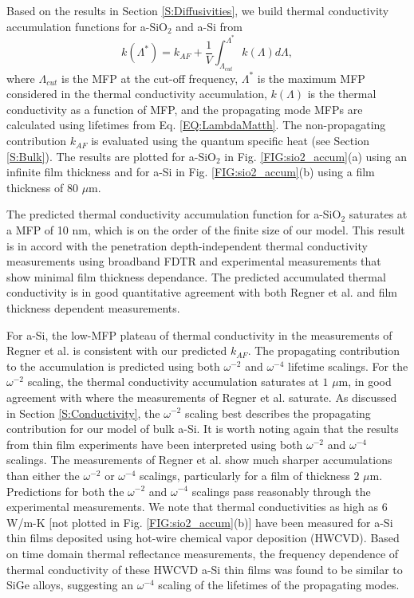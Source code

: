 \documentclass[aps,prb,onecolumn,preprint,superscriptaddress,footinbib,amsmath,amssymb,floatfix]{revtex4}
\begin{document}
Based on the results in Section \ref{S:Diffusivities}, we build 
thermal conductivity accumulation functions for a-SiO$_2$ and a-Si from
\begin{equation}\label{EQ:kLambda}
k(\Lambda^{*}) = k_{AF} + 
\frac{1}{V}\int^{\Lambda^{*}}_{\Lambda_{cut}} 
k(\Lambda)d\Lambda,
\end{equation}
where $\Lambda_{cut}$ is the MFP at the cut-off frequency, 
$\Lambda^*$ is the maximum MFP considered in the thermal 
conductivity accumulation, $k(\Lambda)$ is the thermal conductivity 
as a function of MFP, and the propagating mode MFPs are 
calculated using lifetimes from Eq. \eqref{EQ:LambdaMatth}. The 
non-propagating contribution $k_{AF}$ is evaluated using the quantum 
specific heat (see Section \ref{S:Bulk}). 
The results are plotted for a-SiO$_2$ 
in Fig. \ref{FIG:sio2_accum}(a) using an infinite film thickness 
and for a-Si in Fig. \ref{FIG:sio2_accum}(b) using a film 
thickness of $80$ $\mu$m.  

The predicted thermal conductivity accumulation function for a-SiO$_2$ 
saturates at a MFP of 10 nm, which is on the order of the finite size 
of our model. This result is in accord 
with the penetration depth-independent thermal 
conductivity measurements using broadband FDTR
\cite{regner_broadband_2013} and experimental measurements 
that show minimal film thickness dependance.
\cite{lee_heat_1997,yamane_measurement_2002} The predicted 
accumulated thermal conductivity is in good quantitative 
agreement with both Regner et al. and film thickness dependent 
measurements. 

For a-Si, the low-MFP plateau of thermal conductivity in the   
measurements of Regner et al. is consistent with our 
predicted $k_{AF}$. 
The propagating contribution to the accumulation is predicted 
using both $\omega^{-2}$ and $\omega^{-4}$ lifetime scalings.  
For the $\omega^{-2}$ scaling, the thermal conductivity accumulation 
saturates at $1$ $\mu$m, in good agreement with where the measurements 
of Regner et al. saturate. 
As discussed in Section \ref{S:Conductivity}, 
the $\omega^{-2}$ scaling best describes the propagating 
contribution for our model of bulk a-Si. 
It is worth noting again 
that the results from thin film experiments have been interpreted 
using both $\omega^{-2}$ and $\omega^{-4}$ scalings.
\cite{feldman_thermal_1993,cahill_thermal_1994,
feldman_numerical_1999,zink_thermal_2006,
liu_high_2009,yang_anomalously_2010} 
The measurements of Regner et al. show much sharper accumulations 
than either the $\omega^{-2}$ or $\omega^{-4}$ scalings, 
particularly for a film of thickness $2$ $\mu$m. 
Predictions for both the $\omega^{-2}$ 
and $\omega^{-4}$ scalings pass reasonably 
through the experimental measurements. We note that thermal 
conductivities 
as high as 6 W/m-K [not plotted in Fig. \ref{FIG:sio2_accum}(b)] 
have been measured for a-Si thin films deposited using 
hot-wire chemical vapor deposition (HWCVD).\cite{yang_anomalously_2010} 
Based on time domain 
thermal reflectance measurements, the frequency dependence of  
thermal conductivity of these HWCVD a-Si thin films was found to be 
similar to SiGe alloys, suggesting an $\omega^{-4}$ scaling 
of the lifetimes of the propagating modes.
\end{document}
